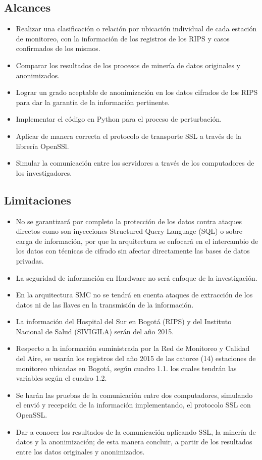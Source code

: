 \documentclass[a4paper,openright,12pt]{book}
\theoremstyle{definition}
\theoremstyle{remark}
\begin{document}
\subsection{Alcances}

\begin{itemize}
\item Realizar una clasificación o relación por ubicación individual de cada estación de monitoreo, con la información de los registros de los RIPS y casos confirmados de los mismos.
\item Comparar los resultados de los procesos de minería de datos originales y anonimizados.
\item Lograr un grado aceptable de anonimización en los datos cifrados de los RIPS para dar la garantía de la información pertinente.
\item Implementar  el código en Python para el proceso de perturbación.
\item Aplicar de manera correcta el protocolo de transporte SSL a través de la librería OpenSSl.
\item Simular la comunicación entre los servidores a través de los computadores de los investigadores.
\end{itemize}

\subsection{Limitaciones}

\begin{itemize}
\item No se garantizará por completo la protección de los datos contra ataques directos como son inyecciones Structured Query Language (SQL) o sobre carga de información, por que la arquitectura se enfocará en el intercambio de los datos con técnicas de cifrado sin afectar directamente las bases de datos privadas. 
\item La seguridad de información en Hardware no será enfoque de la investigación.
\item En la arquitectura SMC no se tendrá en cuenta ataques de extracción de los datos ni de las llaves en la transmisión de la información.
\item La información del Hospital del Sur en Bogotá (RIPS) y del Instituto Nacional de Salud (SIVIGILA) serán del año 2015.
\item Respecto a la información suministrada por la Red de Monitoreo y Calidad del Aire, se usarán los registros del año 2015 de las catorce (14) estaciones de monitoreo ubicadas en Bogotá, según cuadro 1.1. los  cuales tendrán las variables según el cuadro 1.2.
\item Se harán las pruebas de la comunicación entre dos computadores, simulando el envió y recepción de la información implementando, el protocolo SSL con OpenSSL.
\item Dar a conocer los resultados de la comunicación aplicando SSL, la minería de datos y la anonimización; de esta manera concluir, a partir de los resultados entre los datos originales y anonimizados.
\end{itemize}
\end{document}
